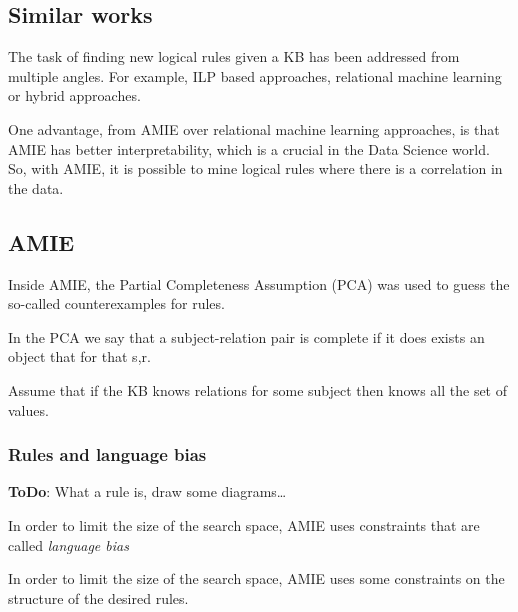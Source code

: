 \documentclass{article}
\begin{document}

\subsection{Similar works}

The task of finding new logical rules given a KB has been addressed from
multiple angles. For example, ILP based approaches, relational machine learning
or hybrid approaches.

One advantage, from AMIE over relational machine learning approaches, is that
AMIE has better interpretability, which is a crucial in the Data Science world.
So, with AMIE, it is possible to mine logical rules where there is a
correlation in the data.

\subsection{AMIE}


Inside AMIE, the Partial Completeness Assumption (PCA) was used to guess the
so-called counterexamples for rules.

In the PCA we say that a subject-relation pair is complete if it does exists
an object that for that s,r.

Assume that if the KB knows relations for some subject then knows all the set
of values.


\subsubsection{Rules and language bias}

\textbf{ToDo}: What a rule is, draw some diagrams\ldots

In order to limit the size of the search space, AMIE uses constraints that are called
\textit{language bias}


In order to limit the size of the search space, AMIE uses some constraints on
the structure of the desired rules.
\end{document}
